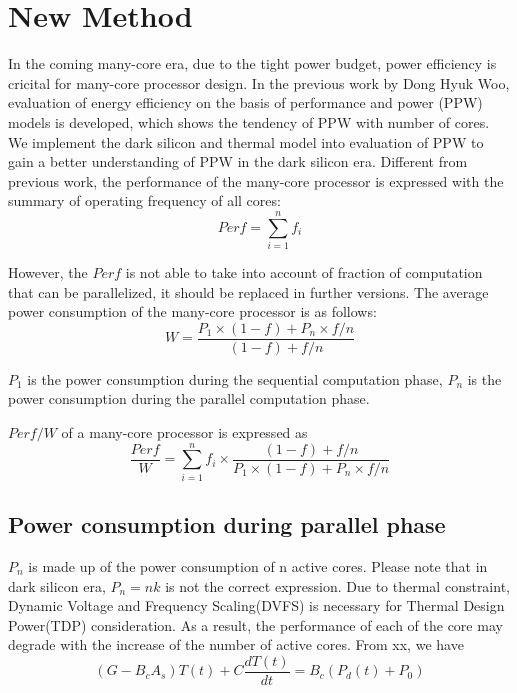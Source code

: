 \section{New Method}
In the coming many-core era, due to the tight power budget, power efficiency is cricital for
many-core processor design. In the previous work by Dong Hyuk Woo, evaluation of energy
efficiency on the basis of performance and power (PPW) models is developed, which shows the
tendency of PPW with number of cores. We implement the dark silicon and thermal model into
evaluation of PPW to gain a better understanding of PPW in the dark silicon era.
Different from previous work, the performance of the many-core processor is expressed with
the summary of operating frequency of all cores:
\begin{equation}\label{perf}
Perf = \sum_{i=1}^n f_{i}
\end{equation}

However, the $Perf$ is not able to take into account of fraction of computation that can be
parallelized, it should be replaced in further versions.
The average power consumption of the many-core processor is as follows:
\begin{equation}\label{average_power}
W = \frac{P_{1} \times (1-f)+P_{n} \times f/n}{(1-f)+f/n}
\end{equation}

$P_{1}$ is the power consumption during the sequential computation phase, $P_{n}$ is the power consumption during the parallel computation phase. 

$Perf/W$ of a many-core processor is expressed as
\begin{equation}\label{perf/w}
\frac{Perf}{W} = \sum_{i=1}^n f_{i} \times \frac{(1-f)+f/n}{P_{1} \times (1-f)+P_{n} \times f/n}
\end{equation}

\subsection{Power consumption during parallel phase}
$P_{n}$ is made up of the power consumption of n active cores. Please note that in dark silicon
era, $P_{n} = nk$ is not the correct expression. Due to thermal constraint, Dynamic Voltage and
Frequency Scaling(DVFS) is necessary for Thermal Design Power(TDP) consideration. As a result,
the performance of each of the core may degrade with the increase of the number of active cores.
From xx, we have
\begin{equation}\label{gt=bp}
(G - B_{c}A_{s})T(t) + C\frac{dT(t)}{dt}= B_{c}(P_{d}(t) + P_{0})
\end{equation}


